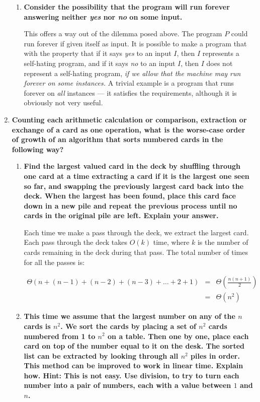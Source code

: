 \documentclass[12pt]{amsart}
\begin{document}
\begin{enumerate}
\begin{enumerate}
\item {\bf Consider the possibility that the program will run forever answering neither {\em yes} nor {\em no} on some input.}

This offers a way out of the dilemma posed above.  The program $P$
could run forever if given itself as input.  It is possible to make a
program that with the property that if it says {\em yes} to an input
$I$, then $I$ represents a self-hating program, and if it says {\em
no} to an input $I$, then $I$ does not represent a self-hating
program, {\em if we allow that the machine may run forever on some
instances.}  A trivial example is a program that runs forever on {\em
all} instances --- it satisfies the requirements, although it is
obviously not very useful.
\end{enumerate}

\medskip

\item {\bf Counting each arithmetic calculation or comparison, extraction or exchange of a card as one operation, what is the worse-case order of growth of an algorithm that sorts numbered cards in the following way?}

\begin{enumerate}
\item {\bf Find the largest valued card in the deck by shuffling through one card at a time extracting a card if it is the largest one seen so far, and swapping the previously largest card back into the deck.  When the largest has been found, place this card face down in a new pile and repeat the previous process until no cards in the original pile are left.  Explain your answer.}

Each time we make a pass through the deck, we extract the largest
card.  Each pass through the deck takes $O(k)$ time, where $k$ is the
number of cards remaining in the deck during that pass.  The total
number of times for all the passes is:

\begin{eqnarray*}
\Theta(n + (n-1) + (n-2) + (n-3) + \ldots + 2 + 1) & = & \Theta(\frac{n(n+1)}{2}) \\
& = & \Theta(n^2)
\end{eqnarray*}

\item
{\bf This time we assume that the largest number on any of the $n$
cards is $n^2$.  We sort the cards by placing a set of $n^2$ cards
numbered from 1 to $n^2$ on a table.  Then one by one, place each
card on top of the number equal to it on the desk.  The sorted
list can be extracted by looking through all $n^2$ piles in order.
This method can be improved to work in linear time.  Explain how.
Hint: This is not easy.  Use division, to try to turn each number
into a pair of numbers, each with a value between $1$ and $n$.}


\end{enumerate}
\end{enumerate}
\end{document}
